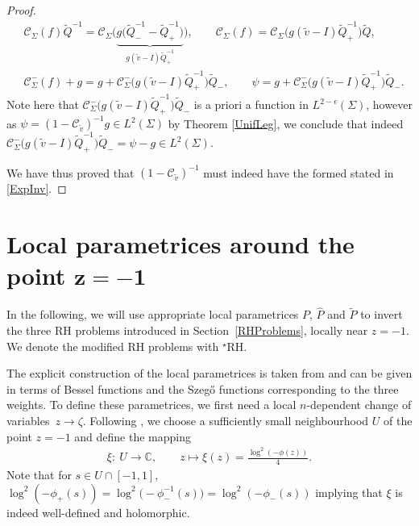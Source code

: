 \documentclass[11pt]{article}
\numberwithin{equation}{section}
\newcommand{\C}{\mathbb{C}}
\newcommand{\Id}{I}
\newcommand{\tQ}{{\widetilde Q}}
\newcommand{\bP}{P}
\newcommand{\hP}{{\widehat P}}
\newcommand{\tP}{{\widetilde P}}
\newcommand{\tv}{{\widetilde v}}
\newcommand{\Cau}{\mathcal C_{\Sigma}}
\newcommand{\Cautv}{\mathcal C_{\tv}}
\newcommand{\Ltwo}{L^2(\Sigma)}
\numberwithin{equation}{section}
\begin{document}
\begin{proof}
 \begin{align*}
& \Cau(f) \tQ^{-1} = \Cau\big(\underbrace{g\big(\tQ_-^{-1}-\tQ_+^{-1}\big)}_{g(\tilde v-\Id) \tQ_+^{-1}}\big),\qquad
 \Cau(f) = \Cau\big(g (\tv-\Id) \tQ_+^{-1}\big)\tQ,
 \\
& \Cau^-(f) + g = g + \Cau^{-}\big(g (\tv-\Id) \tQ_+^{-1}\big)\tQ_-,\qquad
 \psi = g + \Cau^-\big(g (\tv-\Id) \tQ_+^{-1}\big)\tQ_-.
\end{align*}
Note here that $\Cau^-\big(g (\tv-\Id) \tQ_+^{-1}\big)\tQ_-$ is a priori a function in $L^{2-\epsilon}(\Sigma)$, however as $\psi = (1-\Cautv)^{-1}g \in L^2(\Sigma)$ by Theorem \ref{UnifLeg}, we conclude that indeed $\Cau^-\big(g (\tv-\Id) \tQ_+^{-1}\big)\tQ_- = \psi - g \in \Ltwo$.

We have thus proved that $(1-\Cautv)^{-1}$ must indeed have the formed stated in \eqref{ExpInv}.
\end{proof}

\section[Local parametrices around the point z = -1]{Local parametrices around the point $\boldsymbol{z = -1}$}\label{LocPar}
In the following, we will use appropriate local parametrices $\bP$, $\hP$ and $\tP$ to invert the three RH problems introduced in Section~\ref{RHProblems}, locally near $z = -1$. We denote the modified RH problems with ${}^\star$RH.

The explicit construction of the local parametrices is taken from \cite[equation~(6.50)]{KMVV} and can be given in terms of Bessel functions and the Szeg\H{o} functions corresponding to the three weights. To define these parametrices, we first need a local $n$-dependent change of variables~$z\to\zeta$. Following \cite[Section~6]{KMVV}, we choose a sufficiently small neighbourhood $U$ of the point $z = -1$ and define the mapping
\begin{align}\label{defXi}
 \xi\colon\ U \to \C, \qquad z \mapsto \xi(z) = \frac{\log^2(-\phi(z))}{4}.
\end{align}
Note that for $s\in U\cap[-1,1]$, $
\log^2(-\phi_+(s)) = \log^2\bigl(-\phi^{-1}_-(s)\bigr) = \log^2(-\phi_-(s))$ implying that $\xi$ is indeed well-defined and holomorphic.
\end{document}
